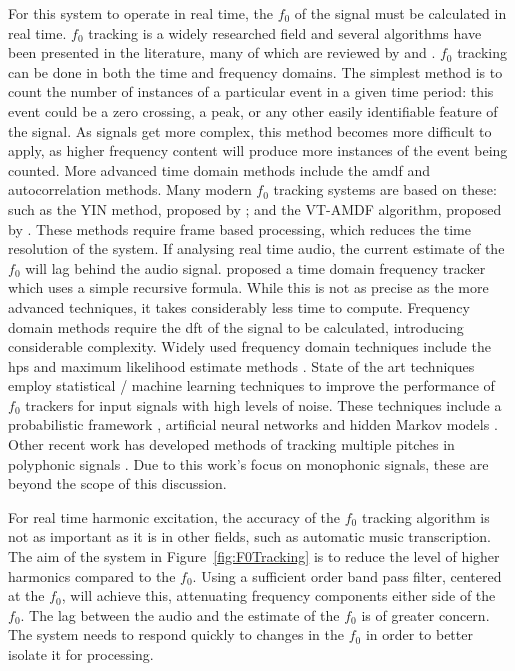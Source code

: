 		For this system to operate in real time, the $f_{0}$ of the signal must be calculated in real time.
		$f_{0}$ tracking is a widely researched field and several algorithms have been presented in the literature,
		many of which are reviewed by \citet{cuadra2001efficient} and \citet{gerhard2003pitch}.  $f_{0}$ tracking
		can be done in both the time and frequency domains. The simplest method is to count the number of instances
		of a particular event in a given time period: this event could be a zero crossing, a peak, or any other
		easily identifiable feature of the signal. As signals get more complex, this method becomes more difficult
		to apply, as higher frequency content will produce more instances of the event being counted. More advanced
		time domain methods include the \acrfull{amdf} and autocorrelation methods.  Many modern $f_{0}$ tracking
		systems are based on these: such as the YIN method, proposed by \citet{decheveigne2002yin}; and the VT-AMDF
		algorithm, proposed by \citet{prukkanon2009vt-amdf}.  These methods require frame based processing, which
		reduces the time resolution of the system. If analysing real time audio, the current estimate of the
		$f_{0}$ will lag behind the audio signal. \citet{larsen2004audio} proposed a time domain frequency tracker
		which uses a simple recursive formula. While this is not as precise as the more advanced techniques, it
		takes considerably less time to compute. Frequency domain methods require the \acrshort{dft} of the signal
		to be calculated, introducing considerable complexity.  Widely used frequency domain techniques include the
		\acrfull{hps} and maximum likelihood estimate methods \citep{noll1969pitch}. State of the art techniques
		employ statistical / machine learning techniques to improve the performance of $f_{0}$ trackers for input
		signals with high levels of noise.  These techniques include a probabilistic framework \citep{chu2012safe},
		artificial neural networks \citep{han2014neural} and hidden Markov models \citep{wang2016f0}. Other recent
		work has developed methods of tracking multiple pitches in polyphonic signals \citep{christensen2008multi}.
		Due to this work's focus on monophonic signals, these are beyond the scope of this discussion.

		For real time harmonic excitation, the accuracy of the $f_{0}$ tracking algorithm is not as important as it
		is in other fields, such as automatic music transcription. The aim of the system in
		Figure~\ref{fig:F0Tracking} is to reduce the level of higher harmonics compared to the $f_{0}$. Using a
		sufficient order band pass filter, centered at the $f_{0}$, will achieve this, attenuating frequency
		components either side of the $f_{0}$. The lag between the audio and the estimate of the $f_{0}$ is of
		greater concern. The system needs to respond quickly to changes in the $f_{0}$ in order to better isolate
		it for processing.

